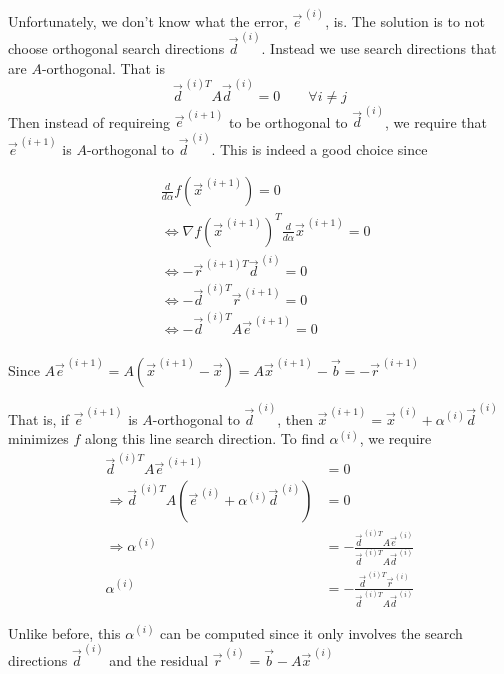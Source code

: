 Unfortunately, we don't know what the error, $\vec{e}^{\,(i)}$, is. The solution is to not choose orthogonal search directions $\vec{d}^{\,(i)}$. Instead we use search directions that are $A$-orthogonal. That is
\begin{equation*}
    \vec{d}^{\,(i)T}A\vec{d}^{\,(i)} = 0 \qquad \forall i\neq j
\end{equation*}
Then instead of requireing $\vec{e}^{\,(i+1)}$ to be orthogonal to $\vec{d}^{\,(i)}$, we require that $\vec{e}^{\,(i+1)}$ is $A$-orthogonal to $\vec{d}^{\,(i)}$. This is indeed a good choice since

\begin{align*}
    &\frac{d}{d\alpha} f\left(\vec{x}^{\,(i+1)}\right) = 0 \\
    &\Leftrightarrow \nabla f\left(\vec{x}^{\,(i+1)}\right)^T \frac{d}{d\alpha}\vec{x}^{\,(i+1)} =0 \\
    &\Leftrightarrow -\vec{r}^{\,(i+1)T}\vec{d}^{\,(i)} = 0 \\
    &\Leftrightarrow -\vec{d}^{\,(i)T} \vec{r}^{\,(i+1)}= 0 \\
    &\Leftrightarrow -\vec{d}^{\,(i)T} A\vec{e}^{\,(i+1)}= 0 \\
\end{align*}

Since $A\vec{e}^{\,(i+1)} = A\left(\vec{x}^{\,(i+1)} -\vec{x}\right)=A\vec{x}^{\,(i+1)} - \vec{b} = -\vec{r}^{\,(i+1)}$

That is, if $\vec{e}^{\,(i+1)}$ is $A$-orthogonal to $\vec{d}^{\,(i)}$, then $\vec{x}^{\,(i+1)} = \vec{x}^{\,(i)} + \alpha^{(i)}\vec{d}^{\,(i)}$ minimizes $f$ along this line search direction. To find $\alpha^{(i)}$, we require
\begin{align*}
    \vec{d}^{\,(i)T}A\vec{e}^{\,(i+1)} &= 0 \\
    \Rightarrow\vec{d}^{\,(i)T}A(\vec{e}^{\,(i)}+ \alpha^{(i)}\vec{d}^{\,(i)}) &= 0 \\
    \Rightarrow\alpha^{(i)} &= - \frac{\vec{d}^{\,(i)T}A\vec{e}^{\,(i)}}{\vec{d}^{\,(i)T}A\vec{d}^{\,(i)}}\\
    \alpha^{(i)} &= - \frac{\vec{d}^{\,(i)T}\vec{r}^{\,(i)}}{\vec{d}^{\,(i)T}A\vec{d}^{\,(i)}}
\end{align*}

Unlike before, this $\alpha^{(i)}$ can be computed since it only involves the search directions $\vec{d}^{\,(i)}$ and the residual $\vec{r}^{\,(i)} = \vec{b} - A\vec{x}^{\,(i)}$


